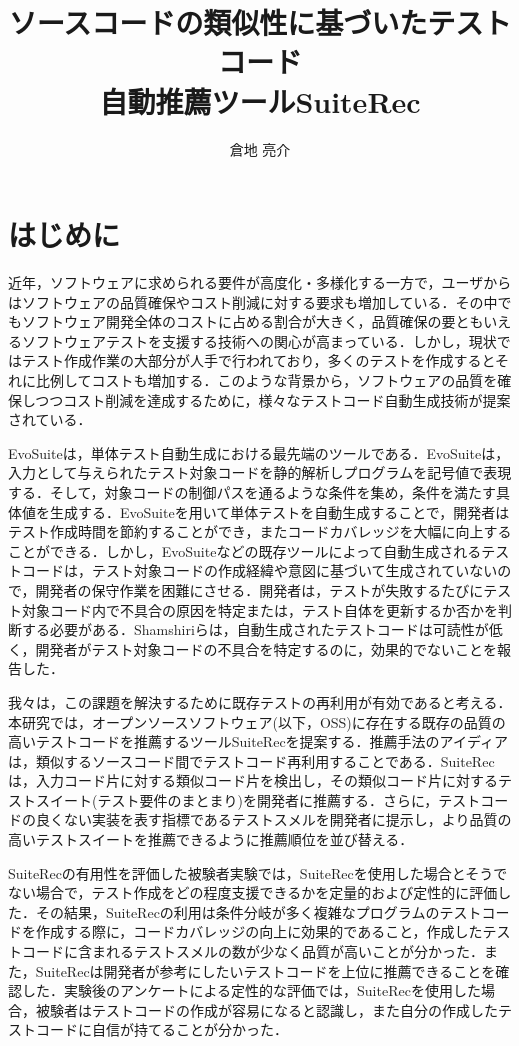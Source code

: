\documentclass[12pt]{jarticle} %
\title{ソースコードの類似性に基づいたテストコード\\自動推薦ツールSuiteRec}
\author{倉地 亮介}
\begin{document}
%
%
\titlepage
\cmemberspage
\firstabstract
\secondabstract
%
%
\toc
\newpage
\listoffigures
\listoftables
%
%
\newpage
\section{はじめに}
近年，ソフトウェアに求められる要件が高度化・多様化する一方で，ユーザからはソフトウェアの品質確保やコスト削減に対する要求も増加している\cite{tanno}．その中でもソフトウェア開発全体のコストに占める割合が大きく，品質確保の要ともいえるソフトウェアテストを支援する技術への関心が高まっている\cite{b20}．しかし，現状ではテスト作成作業の大部分が人手で行われており，多くのテストを作成するとそれに比例してコストも増加する．このような背景から，ソフトウェアの品質を確保しつつコスト削減を達成するために，様々なテストコード自動生成技術が提案されている\cite{b19,EvoSuite,GRT,b17,T3}．

{\sf EvoSuite}\cite{EvoSuite}は，単体テスト自動生成における最先端のツールである．{\sf EvoSuite}は，入力として与えられたテスト対象コードを静的解析しプログラムを記号値で表現する．そして，対象コードの制御パスを通るような条件を集め，条件を満たす具体値を生成する．{\sf EvoSuite}を用いて単体テストを自動生成することで，開発者はテスト作成時間を節約することができ，またコードカバレッジを大幅に向上することができる．しかし，{\sf EvoSuite}などの既存ツールによって自動生成されるテストコードは，テスト対象コードの作成経緯や意図に基づいて生成されていないので，開発者の保守作業を困難にさせる\cite{b14,b15,b13}．開発者は，テストが失敗するたびにテスト対象コード内で不具合の原因を特定または，テスト自体を更新するか否かを判断する必要がある．Shamshiriら\cite{b1}は，自動生成されたテストコードは可読性が低く，開発者がテスト対象コードの不具合を特定するのに，効果的でないことを報告した．

我々は，この課題を解決するために既存テストの再利用が有効であると考える．本研究では，オープンソースソフトウェア(以下，OSS)に存在する既存の品質の高いテストコードを推薦するツール{\sf SuiteRec}を提案する．推薦手法のアイディアは，類似するソースコード間でテストコード再利用することである．{\sf SuiteRec}は，入力コード片に対する類似コード片を検出し，その類似コード片に対するテストスイート(テスト要件のまとまり)を開発者に推薦する．さらに，テストコードの良くない実装を表す指標であるテストスメルを開発者に提示し，より品質の高いテストスイートを推薦できるように推薦順位を並び替える．

{\sf SuiteRec}の有用性を評価した被験者実験では，{\sf SuiteRec}を使用した場合とそうでない場合で，テスト作成をどの程度支援できるかを定量的および定性的に評価した．その結果，{\sf SuiteRec}の利用は条件分岐が多く複雑なプログラムのテストコードを作成する際に，コードカバレッジの向上に効果的であること，作成したテストコードに含まれるテストスメルの数が少なく品質が高いことが分かった．また，{\sf SuiteRec}は開発者が参考にしたいテストコードを上位に推薦できることを確認した．実験後のアンケートによる定性的な評価では，{\sf SuiteRec}を使用した場合，被験者はテストコードの作成が容易になると認識し，また自分の作成したテストコードに自信が持てることが分かった．
\end{document}

